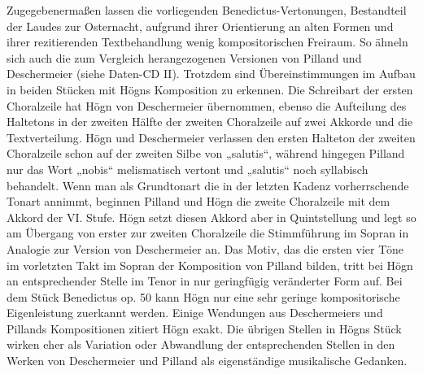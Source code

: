 Zugegebenermaßen lassen die vorliegenden Benedictus-Vertonungen,
Bestandteil der Laudes zur Osternacht, aufgrund ihrer Orientierung an
alten Formen und ihrer rezitierenden Textbehandlung wenig
kompositorischen Freiraum. So ähneln sich auch die zum Vergleich
herangezogenen Versionen von Pilland und Deschermeier (siehe Daten-CD
II). Trotzdem sind Übereinstimmungen im Aufbau in beiden Stücken mit
Högns Komposition zu erkennen. Die Schreibart der ersten Choralzeile
hat Högn von Deschermeier übernommen, ebenso die Aufteilung des
Haltetons in der zweiten Hälfte der zweiten Choralzeile auf zwei
Akkorde und die Textverteilung. Högn und Deschermeier verlassen den
ersten Halteton der zweiten Choralzeile schon auf der zweiten Silbe von
„salutis“, während hingegen Pilland nur das Wort „nobis“ melismatisch
vertont und „salutis“ noch syllabisch behandelt. Wenn man als
Grundtonart die in der letzten Kadenz vorherrschende Tonart annimmt,
beginnen Pilland und Högn die zweite Choralzeile mit dem Akkord der VI.
Stufe. Högn setzt diesen Akkord aber in Quintstellung und legt so am
Übergang von erster zur zweiten Choralzeile die Stimmführung im Sopran
in Analogie zur Version von Deschermeier an. Das Motiv, das die ersten
vier Töne im vorletzten Takt im Sopran der Komposition von Pilland
bilden, tritt bei Högn an entsprechender Stelle im Tenor in nur
geringfügig veränderter Form auf. Bei dem Stück Benedictus op. 50 kann
Högn nur eine sehr geringe kompositorische Eigenleistung zuerkannt
werden. Einige Wendungen aus Deschermeiers und Pillands Kompositionen
zitiert Högn exakt. Die übrigen Stellen in Högns Stück wirken eher als
Variation oder Abwandlung der entsprechenden Stellen in den Werken von
Deschermeier und Pilland als eigenständige musikalische Gedanken.

